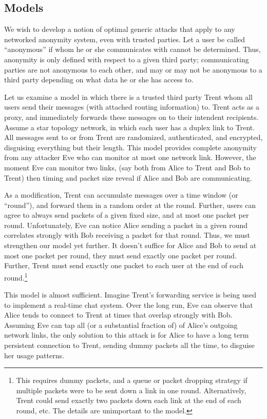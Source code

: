 \documentclass[12pt]{article}
\begin{document}
\subsection{Models}
We wish to develop a notion of optimal generic attacks that apply to any networked anonymity system, even with trusted parties.
Let a user be called ``anonymous'' if whom he or she communicates with cannot be determined.
Thus, anonymity is only defined with respect to a given third party; communicating parties are not anonymous to each other, and may or may not be anonymous to a third party depending on what data he or she has access to.

Let us examine a model in which there is a trusted third party Trent whom all users send their messages (with attached routing information) to.
Trent acts as a proxy, and immediately forwards these messages on to their intendent recipients.
Assume a star topology network, in which each user has a duplex link to Trent.
All messages sent to or from Trent are randomized, authenticated, and encrypted, disguising everything but their length.
This model provides complete anonymity from any attacker Eve who can monitor at most one network link.
However, the moment Eve can monitor two links, (say both from Alice to Trent and Bob to Trent) then timing and packet size reveal if Alice and Bob are communicating.

As a modification, Trent can accumulate messages over a time window (or ``round''), and forward them in a random order at the round.
Further, users can agree to always send packets of a given fixed size, and at most one packet per round.
Unfortunately, Eve can notice Alice sending a packet in a given round correlates strongly with Bob receiving a packet for that round.
Thus, we must strengthen our model yet further.
It doesn't suffice for Alice and Bob to send at most one packet per round, they must send exactly one packet per round.
Further, Trent must send exactly one packet to each user at the end of each round.\footnote{This requires dummy packets, and a queue or packet dropping strategy if multiple packets were to be sent down a link in one round. Alternatively, Trent could send exactly two packets down each link at the end of each round, etc. The details are unimportant to the model.}

This model is almost sufficient.
Imagine Trent's forwarding service is being used to implement a real-time chat system.
Over the long run, Eve can observe that Alice tends to connect to Trent at times that overlap strongly with Bob.
Assuming Eve can tap all (or a substantial fraction of) of Alice's outgoing network links, the only solution to this attack is for Alice to have a long term persistent connection to Trent, sending dummy packets all the time, to disguise her usage patterns.
\end{document}
